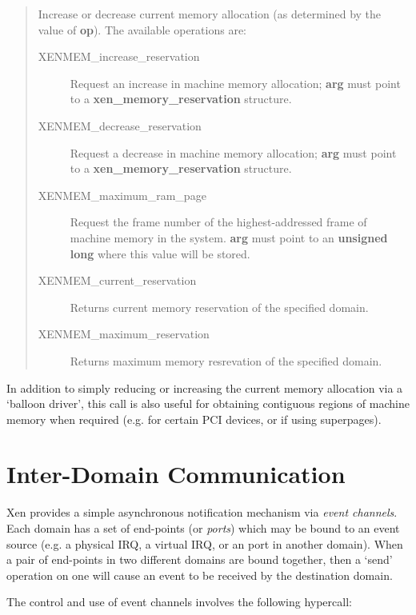 \documentclass[11pt,twoside,final,openright]{report}
\newcommand{\hypercall}[1]{\vspace{2mm}{\sf #1}}
\begin{document}
\begin{quote} 
\hypercall{memory\_op(unsigned int op, void *arg)}

Increase or decrease current memory allocation (as determined by 
the value of {\bf op}).  The available operations are:

\begin{description}
\item[XENMEM\_increase\_reservation] Request an increase in machine
  memory allocation; {\bf arg} must point to a {\bf
  xen\_memory\_reservation} structure.
\item[XENMEM\_decrease\_reservation] Request a decrease in machine
  memory allocation; {\bf arg} must point to a {\bf
  xen\_memory\_reservation} structure.
\item[XENMEM\_maximum\_ram\_page] Request the frame number of the
  highest-addressed frame of machine memory in the system.  {\bf arg}
  must point to an {\bf unsigned long} where this value will be
  stored.
\item[XENMEM\_current\_reservation] Returns current memory reservation
  of the specified domain.
\item[XENMEM\_maximum\_reservation] Returns maximum memory resrevation
  of the specified domain.
\end{description}

\end{quote} 

In addition to simply reducing or increasing the current memory
allocation via a `balloon driver', this call is also useful for 
obtaining contiguous regions of machine memory when required (e.g. 
for certain PCI devices, or if using superpages).  


\section{Inter-Domain Communication}
\label{s:idc} 

Xen provides a simple asynchronous notification mechanism via
\emph{event channels}. Each domain has a set of end-points (or
\emph{ports}) which may be bound to an event source (e.g. a physical
IRQ, a virtual IRQ, or an port in another domain). When a pair of
end-points in two different domains are bound together, then a `send'
operation on one will cause an event to be received by the destination
domain.

The control and use of event channels involves the following hypercall: 
\end{document}
